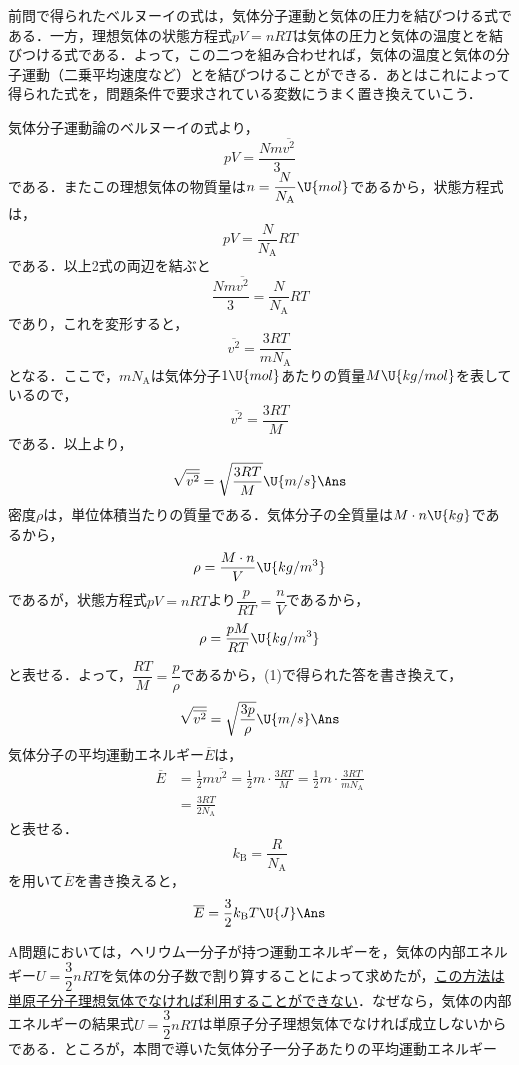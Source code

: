 \begin{multicols}{2}
\par\nopagebreak
\begin{sisin}
前問で得られたベルヌーイの式は，気体分子運動と気体の圧力を結びつける式である．一方，理想気体の状態方程式$pV=nRT$は気体の圧力と気体の温度とを結びつける式である．よって，この二つを組み合わせれば，気体の温度と気体の分子運動（二乗平均速度など）とを結びつけることができる．あとはこれによって得られた式を，問題条件で要求されている変数にうまく置き換えていこう．
\end{sisin}
\KaiHead
\begin{komon}
 気体分子運動論のベルヌーイの式より，
       \[pV=\frac{Nm\overline{v^2}}{3}\]
       である．またこの理想気体の物質量は$n=\dfrac{N}{N_{\mathrm{A}}}\U{mol}$であるから，状態方程式は，
       \[pV=\frac{N}{N_{\mathrm{A}}}RT\]
       である．以上2式の両辺を結ぶと
       \[\frac{Nm\overline{v^2}}{3}=\frac{N}{N_{\mathrm{A}}}RT\]
       であり，これを変形すると，
       \[\overline{v^2}=\frac{3RT}{mN_{\mathrm{A}}}\]
       となる．ここで，$mN_{\mathrm{A}}$は気体分子$1\U{mol}$あたりの質量$M\U{kg/mol}$を表しているので，
       \[\overline{v^2}=\frac{3RT}{M}\]
       である．以上より，
       \[\sqrt{\overline{v^2}}=\sqrt{\frac{3RT}{M}}\U{m/s}\Ans\]
 密度$\rho$は，単位体積当たりの質量である．気体分子の全質量は$M\cdot n\U{kg}$であるから，
       \[\rho=\frac{M\cdot n}{V}\U{kg/m^3}\]
       であるが，状態方程式$pV=nRT$より$\dfrac{p}{RT}=\dfrac{n}{V}$であるから，
       \[\rho=\frac{pM}{RT}\U{kg/m^3}\]
       と表せる．よって，$\dfrac{RT}{M}=\dfrac{p}{\rho}$であるから，(1)で得られた答を書き換えて，
       \[\sqrt{\overline{v^2}}=\sqrt{\frac{3p}{\rho}}\U{m/s}\Ans\]
 気体分子の平均運動エネルギー$\overline{E}$は，
       \[\begin{aligned}
         \overline{E}&=\frac{1}{2}m\overline{v^2}=\frac{1}{2}m\cdot\frac{3RT}{M}=\frac{1}{2}m\cdot\frac{3RT}{mN_{\mathrm{A}}}\\[1mm]
         &=\frac{3RT}{2N_{\mathrm{A}}}
       \end{aligned}\]
       と表せる．
       \[k_{\mathrm{B}}=\frac{R}{N_{\mathrm{A}}}\]
       を用いて$\overline{E}$を書き換えると，
       \[\overline{E}=\frac{3}{2}k_{\mathrm{B}}T\U{J}\Ans\]
\end{komon}
\begin{chuu}
A問題においては，ヘリウム一分子が持つ運動エネルギーを，気体の内部エネルギー$U=\dfrac{3}{2}nRT$を気体の分子数で割り算することによって求めたが，\underline{この方}\hskip0pt\underline{法は単}\hskip0pt\underline{原子分}\hskip0pt\underline{子理想}\hskip0pt\underline{気体で}\hskip0pt\underline{なけれ}\hskip0pt\underline{ば利用}\hskip0pt\underline{するこ}\hskip0pt\underline{とがで}\hskip0pt\underline{きない}．なぜなら，気体の内部エネルギーの結果式$U=\dfrac{3}{2}nRT$は単原子分子理想気体でなければ成立しないからである．ところが，本問で導いた気体分子一分子あたりの平均運動エネルギー

\end{chuu}
\end{multicols}
